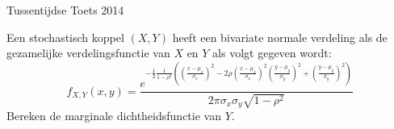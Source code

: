 \documentclass[main.tex]{subfiles}
\begin{document}
\begin{examenvraag}{Tussentijdse Toets 2014}
  \begin{ex-vraag}
    Een stochastisch koppel $(X,Y)$ heeft een bivariate normale verdeling als de gezamelijke verdelingsfunctie van $X$ en $Y$ als volgt gegeven wordt:
    \[
    f_{X,Y}(x,y)
    =
    \frac
    {
      e^{-\frac{1}{2}\frac{1}{1-\rho^{2}}
        \left(
          \left(\frac{x-\mu_{x}}{\sigma_{x}}\right)^{2}
          - 2\rho\left(\frac{x-\mu_{x}}{\sigma_{x}}\right)^{2}\left(\frac{y-\mu_{y}}{\sigma_{y}}\right)^{2}
          + \left(\frac{y-\mu_{y}}{\sigma_{y}}\right)^{2}
        \right)
      }
    }
    {
      2\pi\sigma_{x}\sigma_{y}\sqrt{1-\rho^{2}}
    }
    \]
    Bereken de marginale dichtheidsfunctie van $Y$.
  \end{ex-vraag}


\end{examenvraag}
\end{document}
